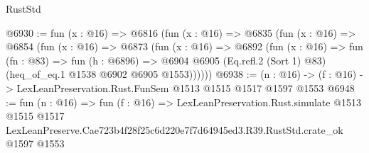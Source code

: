 \begin{lexlean}{RustStd}
\begin{coremodule}
@6930 := fun (x : @16) =>
  @6816
    (fun (x : @16) =>
    @6835
      (fun (x : @16) =>
      @6854
        (fun (x : @16) =>
        @6873
          (fun (x : @16) =>
          @6892
            (fun (x : @16) =>
            fun (fn : @83) =>
            fun (h : @6896) =>
            @6904 @6905 (Eq.refl.{2} (Sort 1) @83) (heq_of_eq.{1} @1538 @6902 @6905 @1553))))))
@6938 := (n : @16) -> (f : @16) -> LexLeanPreservation.Rust.FunSem @1513 @1515 @1517 @1597 @1553
@6948 := fun (n : @16) =>
  fun (f : @16) =>
  LexLeanPreservation.Rust.simulate
    @1513
    @1515
    @1517
    LexLeanPreserve.Cae723b4f28f25c6d220e7f7d64945ed3.R39.RustStd.crate_ok
    @1597
    @1553
\end{coremodule}
\end{lexlean}
